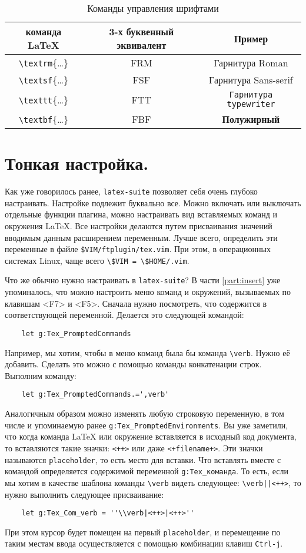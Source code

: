 \documentclass[a4paper]{article}
\begin{document}
			\begin{table}
				\centering
				\begin{tabular}{|c|c|c|}
					\hline
					команда \LaTeX&3-х буквенный эквивалент&Пример\\
					\hline
					\verb|\textrm|\{\ldots\}&FRM&\textrm{Гарнитура Roman}\\
					\verb|\textsf|\{\ldots\}&FSF&\textsf{Гарнитура Sans-serif}\\
					\verb|\texttt|\{\ldots\}&FTT&\texttt{Гарнитура typewriter}\\
					\verb|\textbf|\{\ldots\}&FBF&\textbf{Полужирный}\\
					\hline
				\end{tabular}
				\caption{Команды управления шрифтами}
				\label{tab:fonts}
			\end{table}
\part{Тонкая настройка.}
Как уже говорилось ранее, \texttt{latex-suite} позволяет себя очень глубоко настраивать.
Настройке подлежит буквально все. Можно включать или выключать отдельные функции плагина,
можно настраивать вид вставляемых команд и окружения \LaTeX. Все настройки делаются путем
присваивания значений вводимым данным расширением переменным. Лучше всего, определить эти
переменные в файле \verb|$VIM/ftplugin/tex.vim|. При этом, в операционных системах Linux, 
чаще всего \verb|\$VIM = \$HOME/.vim|.

Что же обычно нужно настраивать в \texttt{latex-suite}? В части \ref{part:insert} уже упоминалось, что 
можно настроить меню команд и окружений, вызываемых по клавишам <F7> и <F5>. Сначала нужно посмотреть,
что содержится в соответствующей переменной. Делается это следующей командой:
\begin{verbatim}
	let g:Tex_PromptedCommands
\end{verbatim}
Например, мы хотим, чтобы в меню команд была бы команда \verb|\verb|. Нужно её добавить. Сделать
это можно с помощью команды конкатенации строк. Выполним команду:
\begin{verbatim}
	let g:Tex_PromptedCommands.=',verb'
\end{verbatim}
Аналогичным образом можно изменять любую строковую переменную, в том числе и упоминаемую ранее
\verb|g:Tex_PromptedEnvironments|.
Вы уже заметили, что когда команда \LaTeX{} или окружение вставляется в исходный код документа, 
то вставляются такие значки: \verb|<++>| или даже \verb|<+filename+>|. Эти значки называются 
\texttt{placeholder}, то есть место для вставки. Что вставлять вместе с командой определяется 
содержимой переменной \verb|g:Tex_команда|. То есть, если мы хотим в качестве шаблона команды \verb|\verb| 
видеть следующее: \verb$\verb||<++>$, то нужно выполнить следующее присваивание:
\begin{verbatim}
	let g:Tex_Com_verb = ''\\verb|<++>|<++>''
\end{verbatim}
При этом курсор будет помещен на первый \texttt{placeholder}, и перемещение по таким 
местам ввода осуществляется с помощью комбинации клавиш \texttt{Ctrl-j}.
\end{document}
